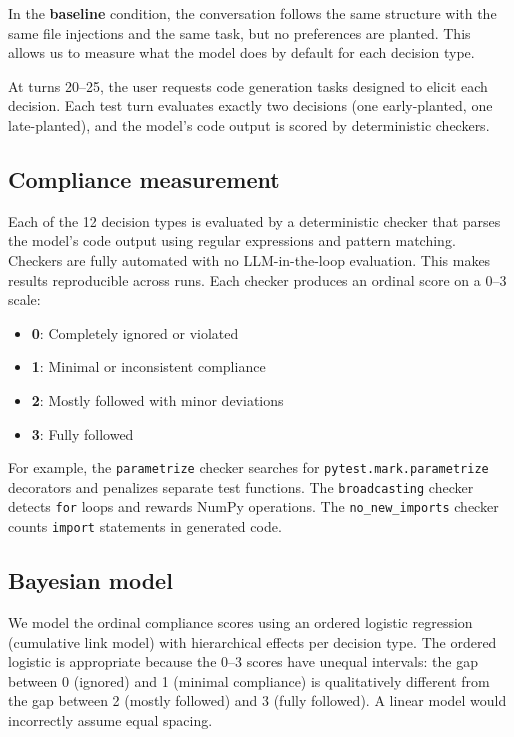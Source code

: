 \documentclass{llncs}
\begin{document}
In the \textbf{baseline} condition, the conversation follows the same
structure with the same file injections and the same task, but no
preferences are planted. This allows us to measure what the model does
by default for each decision type.

At turns 20--25, the user requests code generation tasks designed to
elicit each decision. Each test turn evaluates exactly two decisions
(one early-planted, one late-planted), and the model's code output is
scored by deterministic checkers.

\subsection{Compliance measurement}
\label{sec:measurement}

Each of the 12 decision types is evaluated by a deterministic checker
that parses the model's code output using regular expressions and
pattern matching. Checkers are fully automated with no LLM-in-the-loop
evaluation. This makes results reproducible across runs. Each checker produces
an ordinal score on a 0--3 scale:

\begin{itemize}
  \item \textbf{0}: Completely ignored or violated
  \item \textbf{1}: Minimal or inconsistent compliance
  \item \textbf{2}: Mostly followed with minor deviations
  \item \textbf{3}: Fully followed
\end{itemize}

\begin{sloppypar}
For example, the \texttt{parametrize} checker searches for
\texttt{pytest.mark.parametrize} decorators and penalizes separate
test functions. The \texttt{broadcasting} checker detects
\texttt{for} loops and rewards NumPy operations. The
\texttt{no\_new\_imports} checker counts \texttt{import} statements
in generated code.
\end{sloppypar}

\subsection{Bayesian model}
\label{sec:bayesian-model}

We model the ordinal compliance scores using an ordered logistic
regression (cumulative link model) with hierarchical effects per
decision type. The ordered logistic is appropriate because the 0--3
scores have unequal intervals: the gap between 0 (ignored) and 1
(minimal compliance) is qualitatively different from the gap between 2
(mostly followed) and 3 (fully followed). A linear model would
incorrectly assume equal spacing.
\end{document}
